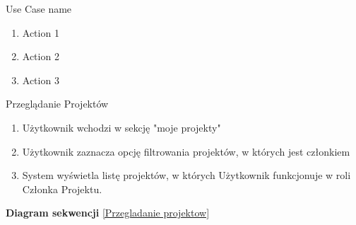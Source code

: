 \begin{usecase}{Use Case name}
	\begin{enumerate}
		\item Action 1
		\item Action 2
		\item Action 3
	\end{enumerate}
	\beginalternatives
	\precond{\todo}
	\postcond{\todo}
\end{usecase}


\begin{usecase}{Przeglądanie Projektów}
\label{przegladanie_projektow}
	\begin{enumerate}
      \item Użytkownik wchodzi w sekcję "moje projekty"
      \item Użytkownik zaznacza opcję filtrowania projektów, w których jest członkiem
      \item System wyświetla listę projektów, w których Użytkownik funkcjonuje w roli Członka Projektu.
	\end{enumerate}
	\parindent=0cm
	\textbf{Diagram sekwencji}
	\ref{Przegladanie projektow}
\end{usecase}


